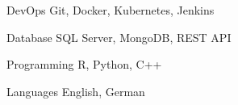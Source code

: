 

\begin{cvskills}

  \cvskill
    {DevOps} %
    {Git, Docker, Kubernetes, Jenkins} %

  \cvskill
    {Database} %
    {SQL Server, MongoDB, REST API} %

  \cvskill
    {Programming} %
    {R, Python, C++} %

  \cvskill
    {Languages} %
    {English, German} %

\end{cvskills}
